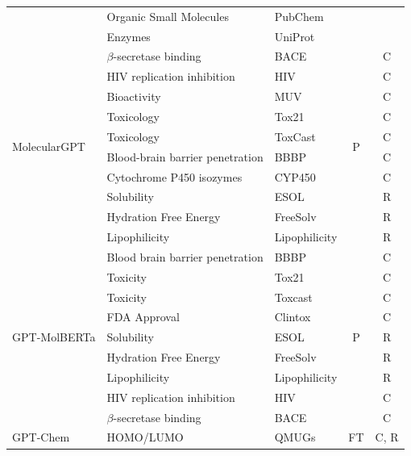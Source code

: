 \begin{reply}
\begin{table}[htbp]
{\begin{tabular}{lllcc}
        & Organic Small Molecules & PubChem\\
        & Enzymes & UniProt\\
        \midrule
        \multirow{10}{*}{MolecularGPT\autocite{liu2024moleculargpt}} & $\beta$-secretase binding & BACE \autocite{wu2018moleculenet} & \multirow{10}{*}{P} & C\\
        & HIV replication inhibition & HIV\autocite{wu2018moleculenet} & & C\\
        & Bioactivity & MUV \autocite{rohrer2009maximum} & & C\\
        & Toxicology & Tox21 \autocite{richard_tox21_2021} & & C \\
        & Toxicology & ToxCast \autocite{us2015toxicity} & & C\\
        & Blood-brain barrier penetration & BBBP\autocite{sakiyama_prediction_2021} & & C\\
        & Cytochrome P450 isozymes & CYP450 \autocite{ni2025curated} & & C\\
        & Solubility & ESOL \autocite{delaneyesol2004} & & R\\
        & Hydration Free Energy & FreeSolv \autocite{mobley_freesolv_2014}& & R\\
        & Lipophilicity& Lipophilicity\autocite{wu2018moleculenet} & & R\\
        \midrule
        \multirow{9}{*}{GPT-MolBERTa \autocite{balaji2023gptmolberta}} & Blood brain barrier penetration & BBBP\autocite{sakiyama_prediction_2021} & \multirow{9}{*}{P} & C\\
        & Toxicity & Tox21 \autocite{richard_tox21_2021} & & C\\
        & Toxicity & Toxcast \autocite{us2015toxicity} & & C\\
        & FDA Approval & Clintox \autocite{wu2018moleculenet} & & C \\
        & Solubility & ESOL \autocite{delaneyesol2004} & & R\\
        & Hydration Free Energy& FreeSolv\autocite{mobley_freesolv_2014} & &R \\
        & Lipophilicity & Lipophilicity \autocite{wu2018moleculenet}& & R\\
        & HIV replication inhibition& HIV\autocite{wu2018moleculenet} & & C\\
        &  $\beta$-secretase binding & BACE \autocite{wu2018moleculenet} & &  C\\
        \midrule
        \multirow{7}{*}{GPT-Chem\autocite{jablonka2024leveraging}} & HOMO/LUMO & QMUGs\autocite{isert_qmugs_2022} & \multirow{7}{*}{FT} & C, R \\

\end{tabular}}
\end{table}
\end{reply}
